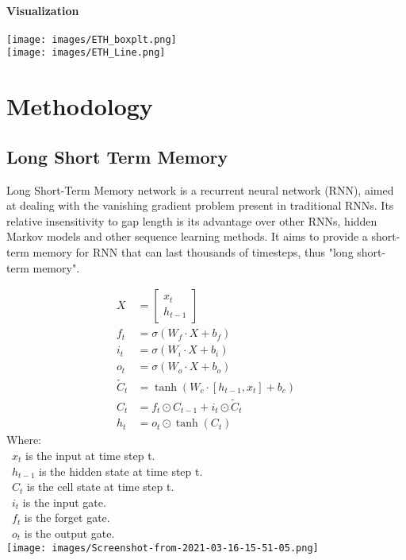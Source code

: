 \documentclass{ieeeojies}
\begin{document}
\paragraph{Visualization}
\texttt{[image: images/ETH\_boxplt.png]}\\
\texttt{[image: images/ETH\_Line.png]}

\section{Methodology}
\subsection{Long Short Term Memory}
Long Short-Term Memory network is a recurrent neural network (RNN), aimed at dealing with the vanishing gradient problem present in traditional RNNs. Its relative insensitivity to gap length is its advantage over other RNNs, hidden Markov models and other sequence learning methods. It aims to provide a short-term memory for RNN that can last thousands of timesteps, thus "long short-term memory".

\begin{align*}
X &= \begin{bmatrix}
    x_t \\
    h_{t-1}
\end{bmatrix} \\
f_t &= \sigma(W_f \cdot X + b_f) \\
i_t &= \sigma(W_i \cdot X + b_i) \\
o_t &= \sigma(W_o \cdot X + b_o) \\
\tilde{C}_t &= \tanh(W_c \cdot [h_{t-1}, x_t] + b_c) \\
C_t &= f_t \odot C_{t-1} + i_t \odot \tilde{C}_t \\
h_t &= o_t \odot \tanh(C_t)
\end{align*}
Where:\\
\indent \textbullet\ \(x_t\) is the input at time step t.\\
\indent \textbullet\ \(h_{t-1}\) is the hidden state at time step t.\\
\indent \textbullet\ \(C_t\) is the cell state at time step t.\\
\indent \textbullet\ \(i_t\) is the input gate.\\
\indent \textbullet\ \(f_t\) is the forget gate.\\
\indent \textbullet\ \(o_t\) is the output gate.\\
\texttt{[image: images/Screenshot-from-2021-03-16-15-51-05.png]}
\end{document}
